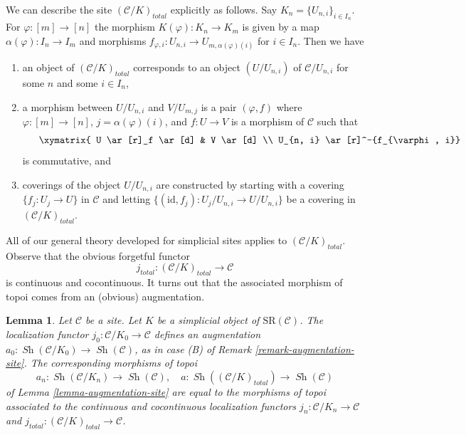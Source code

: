\documentclass[10pt,a4paper]{amsart}
\theoremstyle{plain}
\newtheorem{lemma}[subsection]{Lemma}
\theoremstyle{definition}
\theoremstyle{remark}
\numberwithin{equation}{subsection}
\def\Sh{\mathop{\mathit{Sh}}\nolimits}
\begin{document}
\medskip\noindent
We can describe the site $(\mathcal{C}/K)_{total}$ explicitly as follows.
Say $K_n = \{U_{n, i}\}_{i \in I_n}$. For $\varphi : [m] \to [n]$
the morphism $K(\varphi) : K_n \to K_m$ is given by a map
$\alpha(\varphi) : I_n \to I_m$ and morphisms
$f_{\varphi, i} : U_{n, i} \to U_{m, \alpha(\varphi)(i)}$ for $i \in I_n$.
Then we have
\begin{enumerate}
\item an object of $(\mathcal{C}/K)_{total}$
corresponds to an object $(U/U_{n, i})$
of $\mathcal{C}/U_{n, i}$ for some $n$ and some $i \in I_n$,
\item a morphism between $U/U_{n, i}$ and $V/U_{m, j}$
is a pair $(\varphi, f)$ where $\varphi : [m] \to [n]$,
$j = \alpha(\varphi)(i)$, and $f : U \to V$ is a morphism of
$\mathcal{C}$ such that
$$
\vcenter{
\xymatrix{
U \ar[r]_f \ar[d] & V \ar[d] \\
U_{n, i} \ar[r]^-{f_{\varphi, i}} &
U_{m, j}
}
}
$$
is commutative, and
\item coverings of the object $U/U_{n, i}$ are constructed
by starting with a covering $\{f_j : U_j \to U\}$ in $\mathcal{C}$
and letting $\{(\text{id}, f_j) : U_j/U_{n, i} \to U/U_{n, i}\}$
be a covering in $(\mathcal{C}/K)_{total}$.
\end{enumerate}
All of our general theory developed for simplicial sites applies to
$(\mathcal{C}/K)_{total}$. Observe that the obvious forgetful functor
$$
j_{total} : (\mathcal{C}/K)_{total} \longrightarrow \mathcal{C}
$$
is continuous and cocontinuous. It turns out that the associated
morphism of topoi comes from an (obvious) augmentation.

\begin{lemma}
\label{lemma-augmentation-simplicial-semi-representable}
Let $\mathcal{C}$ be a site. Let $K$ be a simplicial object of
$\text{SR}(\mathcal{C})$. The localization functor
$j_0 : \mathcal{C}/K_0 \to \mathcal{C}$ defines an augmentation
$a_0 : \Sh(\mathcal{C}/K_0) \to \Sh(\mathcal{C})$, as in case (B) of
Remark \ref{remark-augmentation-site}.
The corresponding morphisms of topoi
$$
a_n : \Sh(\mathcal{C}/K_n) \longrightarrow \Sh(\mathcal{C}),\quad
a : \Sh((\mathcal{C}/K)_{total}) \longrightarrow \Sh(\mathcal{C})
$$
of Lemma \ref{lemma-augmentation-site}
are equal to the morphisms of topoi associated to the
continuous and cocontinuous localization functors
$j_n : \mathcal{C}/K_n \to \mathcal{C}$ and
$j_{total} : (\mathcal{C}/K)_{total} \to \mathcal{C}$.
\end{lemma}
\end{document}
